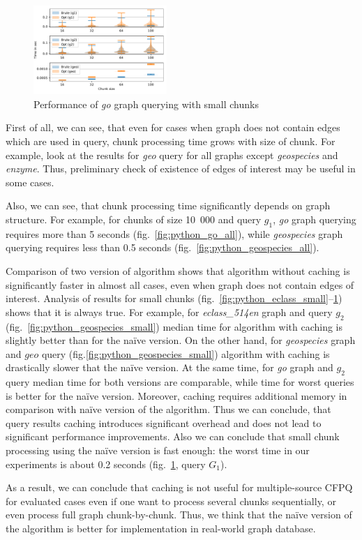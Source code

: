 \begin{figure}[h]
\centering
\includegraphics[width=0.45\textwidth]{data/raw/go_4.pdf}
\caption{Performance of \textit{go} graph querying with small chunks}
\label{fig:python_go_small}
\end{figure}


First of all, we can see, that even for cases when graph does not contain edges which are used in query, chunk processing time grows with size of chunk. 
For example, look at the results for \textit{geo} query for all graphs except \textit{geospecies} and \textit{enzyme}.
Thus, preliminary check of existence of edges of interest may be useful in some cases.

Also, we can see, that chunk processing time significantly depends on graph structure. 
For example, for chunks of size 10~000 and query $g_1$, \textit{go} graph querying requires more than 5 seconds (fig.~\ref{fig:python_go_all}), while \textit{geospecies} graph querying requires less than 0.5 seconds (fig.~\ref{fig:python_geospecies_all}).  

Comparison of two version of algorithm shows that algorithm without caching is significantly faster in almost all cases, even when graph does not contain edges of interest. 
Analysis of results for small chunks (fig.~\ref{fig:python_eclass_small}--\ref{fig:python_go_small}) shows that it is always true. 
For example, for \textit{eclass\_514en} graph and query $g_2$ (fig.~\ref{fig:python_geospecies_small}) median time for algorithm with caching is slightly better than for the na\"{i}ve version.
On the other hand, for \textit{geospecies} graph and $geo$ query (fig.\ref{fig:python_geospecies_small}) algorithm with caching is drastically slower that the na\"{i}ve version.
At the same time, for \textit{go} graph and $g_2$ query median time for both versions are comparable, while time for worst queries is better for the na\"{i}ve version.
Moreover, caching requires additional memory in comparison with na\"{i}ve version of the algorithm.
Thus we can conclude, that query results caching introduces significant overhead and does not lead to significant performance improvements.
Also we can conclude that small chunk processing using the na\"{i}ve version is fast enough: the worst time in our experiments is about 0.2 seconds (fig.~\ref{fig:python_go_small}, query $G_1$). 


As a result, we can conclude that caching is not useful for multiple-source CFPQ for evaluated cases even if one want to process several chunks sequentially, or even process full graph chunk-by-chunk.
Thus, we think that the na\"{i}ve version of the algorithm is better for implementation in real-world graph database. 



